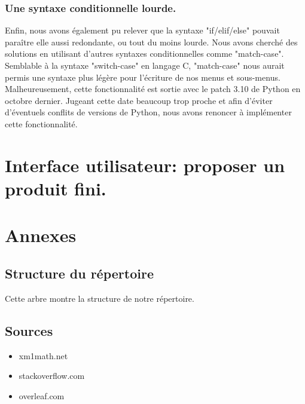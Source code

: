 \documentclass[10pt,a4paper,french,titlepage]{article}
\theoremstyle{definition}
\begin{document}
\subsubsection{Une syntaxe conditionnelle lourde.}
Enfin, nous avons également pu relever que la syntaxe "if/elif/else" pouvait paraître elle aussi redondante, ou tout du moins lourde. Nous avons cherché des solutions en utilisant d'autres syntaxes conditionnelles comme "match-case". Semblable à la syntaxe "switch-case" en langage C, "match-case" nous aurait permis une syntaxe plus légère pour l'écriture de nos menus et sous-menus. Malheureusement, cette fonctionnalité est sortie avec le patch 3.10 de Python en octobre dernier. Jugeant cette date beaucoup trop proche et afin d'éviter d'éventuels conflits de versions de Python, nous avons renoncer à implémenter cette fonctionnalité.
\section{Interface utilisateur: proposer un produit fini.}
\section{Annexes}
\subsection{Structure du répertoire}\label{arbre}

Cette arbre montre la structure de notre répertoire.\\
\hspace*{\fill}
%
\hspace*{\fill}

\subsection{Sources}
\begin{itemize}
\item xm1math.net\\
\item stackoverflow.com\\
\item overleaf.com
\end{itemize}
\end{document}
